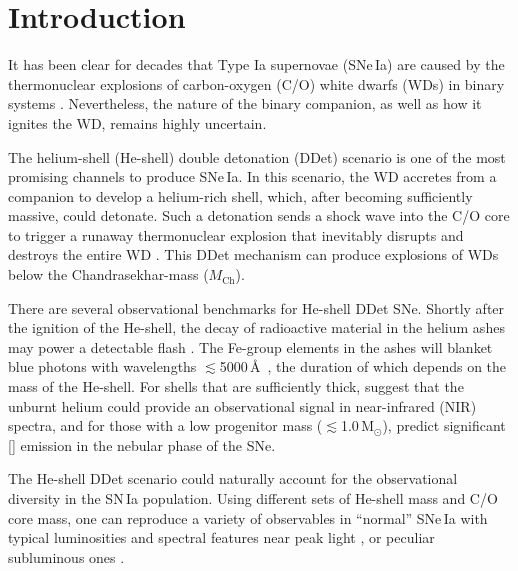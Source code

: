 \documentclass[twocolumn]{aastex631}
\newcommand{\Mch}{$M_\mathrm{Ch}$}
\newcommand{\Msun}{\mathrm{M_\odot}}
\begin{document}

\section{Introduction} \label{sec:intro}
It has been clear for decades that Type Ia supernovae (SNe\,Ia) are caused by the thermonuclear explosions of carbon-oxygen (C/O) white dwarfs (WDs) in binary systems \citep[see][for a review]{Maoz_2014}. Nevertheless, the nature of the binary companion, as well as how it ignites the WD, remains highly uncertain. 

The helium-shell (He-shell) double detonation (DDet) scenario is one of the most promising channels to produce SNe\,Ia. In this scenario, the WD accretes from a companion to develop a helium-rich shell, which, after becoming sufficiently massive, could detonate. Such a detonation sends a shock wave into the C/O core to trigger a runaway thermonuclear explosion that inevitably disrupts and destroys the entire WD \citep{Nomoto_1982a, Nomoto_1982b, Woosley_1986, Livne_1990, Woosley_1994, Livne_1995}. This DDet mechanism can produce explosions of WDs below the Chandrasekhar-mass (\Mch).

There are several observational benchmarks for He-shell DDet SNe. Shortly after the ignition of the He-shell, the decay of radioactive material in the helium ashes may power a detectable flash \citep{Woosley_1994,Fink_DD_2010,Kromer_DD_2010}. The Fe-group elements in the ashes will blanket blue photons with wavelengths $\lesssim$5000\,\AA\ \citep{Kromer_DD_2010}, the duration of which depends on the mass of the He-shell. For shells that are sufficiently thick, \citet{Boyle2017_Helium} suggest that the unburnt helium could provide an observational signal in near-infrared (NIR) spectra, and for those with a low progenitor mass ($\lesssim$1.0\,$\Msun$), \citet{polin_nebular_2021} predict significant [] emission in the nebular phase of the SNe.

The He-shell DDet scenario could naturally account for the observational diversity in the SN\,Ia population. Using different sets of He-shell mass and C/O core mass, one can reproduce a variety of observables in ``normal'' SNe\,Ia with typical luminosities and spectral features near peak light \citep[e.g.,][]{polin_observational_2019,Townsley_2019,Shen_2D_2021}, or peculiar subluminous ones \citep[e.g.,][]{polin_observational_2019}. 
\end{document}
